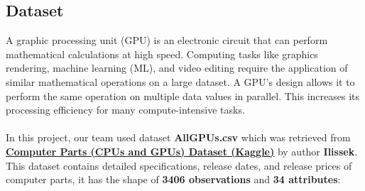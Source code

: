 \documentclass[a4paper]{article}
\theoremstyle{definition}
\begin{document}
\subsection{Dataset}
A graphic processing unit (GPU) is an electronic circuit that can perform mathematical calculations at high speed. Computing tasks like graphics rendering, machine learning (ML), and video editing require the application of similar mathematical operations on a large dataset. A GPU’s design allows it to perform the same operation on multiple data values in parallel. This increases its processing efficiency for many compute-intensive tasks.\\
\\
In this project, our team used dataset \textbf{All\textunderscore GPUs.csv} which was retrieved from \href{https://www.kaggle.com/iliassekkaf/computerparts}{\textbf{Computer Parts (CPUs and GPUs) Dataset (Kaggle)}} by author \textbf{Ilissek}. This dataset contains detailed specifications, release dates, and release prices of computer parts, it has the shape of \textbf{3406 observations} and \textbf{34 attributes}: 
\end{document}
